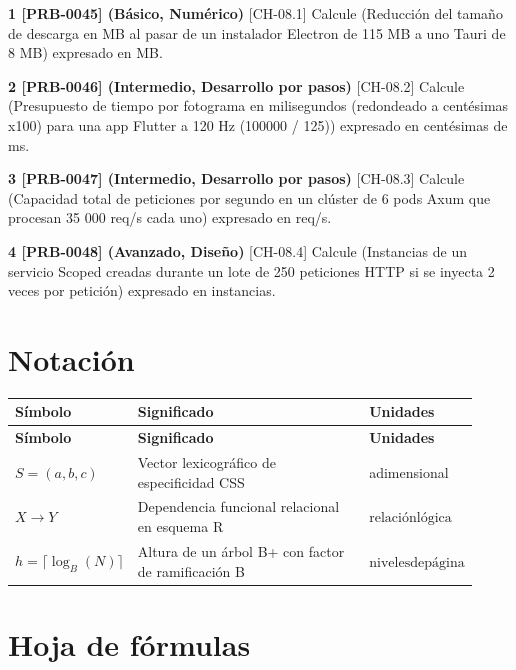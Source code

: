 \documentclass{book}
\begin{document}
\begin{tcolorbox}[title={Ejercicios}, studiumworked, breakable]

\noindent\textbf{1 [PRB-0045] (Básico, Numérico)}
[CH-08.1] Calcule (Reducción del tamaño de descarga en MB al pasar de un instalador Electron de 115 MB a uno Tauri de 8 MB) expresado en MB.

\noindent\textbf{2 [PRB-0046] (Intermedio, Desarrollo por pasos)}
[CH-08.2] Calcule (Presupuesto de tiempo por fotograma en milisegundos (redondeado a centésimas x100) para una app Flutter a 120 Hz (100000 / 125)) expresado en centésimas de ms.

\noindent\textbf{3 [PRB-0047] (Intermedio, Desarrollo por pasos)}
[CH-08.3] Calcule (Capacidad total de peticiones por segundo en un clúster de 6 pods Axum que procesan 35 000 req/s cada uno) expresado en req/s.

\noindent\textbf{4 [PRB-0048] (Avanzado, Diseño)}
[CH-08.4] Calcule (Instancias de un servicio Scoped creadas durante un lote de 250 peticiones HTTP si se inyecta 2 veces por petición) expresado en instancias.
\end{tcolorbox}
\appendix
\chapter{Notación}

\begingroup
\setlength{\LTpre}{0pt}
\setlength{\LTpost}{0pt}
\begin{longtable}{@{}>{\centering\arraybackslash}p{0.17\linewidth}>{\raggedright\arraybackslash}p{0.55\linewidth}>{\raggedright\arraybackslash}p{0.2\linewidth}@{}}
\textbf{Símbolo} & \textbf{Significado} & \textbf{Unidades} \\
\hline
\endfirsthead
\textbf{Símbolo} & \textbf{Significado} & \textbf{Unidades} \\
\hline
\endhead
$S = (a, b, c)$ & Vector lexicográfico de especificidad CSS & adimensional \\
$X \to Y$ & Dependencia funcional relacional en esquema R & $\mathrm{relación lógica}$ \\
$h = \lceil \log_B(N) \rceil$ & Altura de un árbol B+ con factor de ramificación B & $\mathrm{niveles de página}$ \\
\end{longtable}
\endgroup
\chapter{Hoja de fórmulas}
\end{document}
